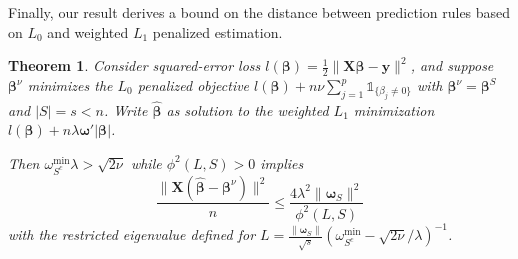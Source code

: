 \documentclass[12pt]{article}
\newtheorem{theorem}{\sc Theorem}[section]
\newcommand{\bs}[1]{\boldsymbol{#1}}
\newcommand{\mr}[1]{\mathrm{#1}}
\newcommand{\bm}[1]{\mathbf{#1}}
\newcommand{\ds}[1]{\mathds{#1}}
\begin{document}
Finally, our result derives a bound on the distance between prediction rules based on $L_0$ and weighted $L_1$ penalized estimation.
\begin{theorem} \label{sparseapprox}  Consider squared-error loss $l(\bs{\beta}) =
\frac{1}{2}\|\bm{X}\bs{\beta}-\bm{y}\|^2$, and suppose $\bs{\beta}^{\nu}$ minimizes the $L_0$ penalized objective $l(\bs{\beta}) + n\nu\sum_{j=1}^p\ds{1}_{\{\beta_j\neq0\}}$ with $\bs{\beta}^\nu = \bs{\beta}^S$ and $|S|=s<n$.   
Write $\bs{\hat\beta}$ as solution to the weighted $L_1$ minimization $l(\bs{\beta}) + n\lambda\bs{\omega}'|\bs{\beta}|$. 

Then  
$\omega^{\mr{min}}_{S^c}\lambda > \sqrt{2\nu}$ while $\phi^2(L,S) > 0$ implies
\begin{equation} \frac{\|\bm{X}(\bs{\hat\beta}-\bs{\beta}^\nu)\|^2}{n}\leq
\frac{4\lambda^2 \|\bs{\omega}_S\|^2}{\phi^2(L, S)}
\end{equation} 
with the restricted eigenvalue defined for 
 $L = \frac{\|\bs{\omega}_S\|}{\sqrt{s}}(\omega^{\mr{min}}_{S^c}-\sqrt{2\nu}/\lambda)^{-1}$.
\end{theorem}
\end{document}
